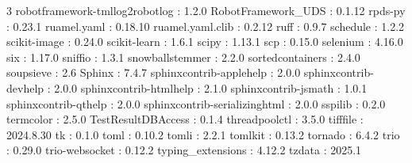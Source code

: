 \begin{multicols}{3}
robotframework-tmllog2robotlog : 1.2.0\newline
RobotFramework\_UDS : 0.1.12\newline
rpds-py : 0.23.1\newline
ruamel.yaml : 0.18.10\newline
ruamel.yaml.clib : 0.2.12\newline
ruff : 0.9.7\newline
schedule : 1.2.2\newline
scikit-image : 0.24.0\newline
scikit-learn : 1.6.1\newline
scipy : 1.13.1\newline
scp : 0.15.0\newline
selenium : 4.16.0\newline
six : 1.17.0\newline
sniffio : 1.3.1\newline
snowballstemmer : 2.2.0\newline
sortedcontainers : 2.4.0\newline
soupsieve : 2.6\newline
Sphinx : 7.4.7\newline
sphinxcontrib-applehelp : 2.0.0\newline
sphinxcontrib-devhelp : 2.0.0\newline
sphinxcontrib-htmlhelp : 2.1.0\newline
sphinxcontrib-jsmath : 1.0.1\newline
sphinxcontrib-qthelp : 2.0.0\newline
sphinxcontrib-serializinghtml : 2.0.0\newline
sspilib : 0.2.0\newline
termcolor : 2.5.0\newline
TestResultDBAccess : 0.1.4\newline
threadpoolctl : 3.5.0\newline
tifffile : 2024.8.30\newline
tk : 0.1.0\newline
toml : 0.10.2\newline
tomli : 2.2.1\newline
tomlkit : 0.13.2\newline
tornado : 6.4.2\newline
trio : 0.29.0\newline
trio-websocket : 0.12.2\newline
typing\_extensions : 4.12.2\newline
tzdata : 2025.1\newline

\end{multicols}
